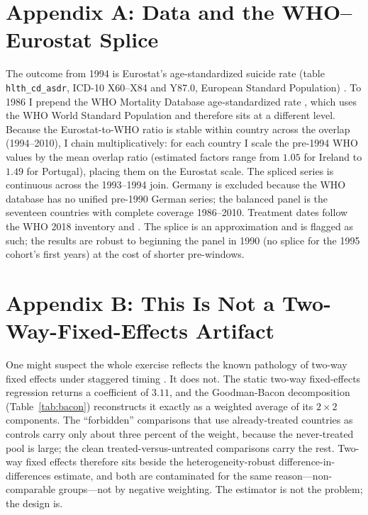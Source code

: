 \documentclass[12pt]{article}
\begin{document}
\clearpage
\appendix
\singlespacing

\section{Appendix A: Data and the WHO--Eurostat Splice}

The outcome from 1994 is Eurostat's age-standardized suicide rate (table \texttt{hlth\_cd\_asdr},
ICD-10 X60--X84 and Y87.0, European Standard Population) \citep{eurostat_cod}. To 1986 I prepend the
WHO Mortality Database age-standardized rate \citep{who_mdb}, which uses the WHO World Standard
Population and therefore sits at a different level. Because the Eurostat-to-WHO ratio is stable within
country across the overlap (1994--2010), I chain multiplicatively: for each country I scale the
pre-1994 WHO values by the mean overlap ratio (estimated factors range from $1.05$ for Ireland to
$1.49$ for Portugal), placing them on the Eurostat scale. The spliced series is continuous across the
1993--1994 join. Germany is excluded because the WHO database has no unified pre-1990 German series;
the balanced panel is the seventeen countries with complete coverage 1986--2010. Treatment dates
follow the WHO 2018 inventory and \citet{lewitzka2019national}. The splice is an approximation and is
flagged as such; the results are robust to beginning the panel in 1990 (no splice for the 1995
cohort's first years) at the cost of shorter pre-windows.

\section{Appendix B: This Is Not a Two-Way-Fixed-Effects Artifact}

One might suspect the whole exercise reflects the known pathology of two-way fixed effects under
staggered timing \citep{goodmanbacon2021did}. It does not. The static two-way fixed-effects
regression returns a coefficient of $3.11$, and the Goodman-Bacon decomposition
(Table~\ref{tab:bacon}) reconstructs it exactly as a weighted average of its $2\times2$ components.
The ``forbidden'' comparisons that use already-treated countries as controls carry only about three
percent of the weight, because the never-treated pool is large; the clean treated-versus-untreated
comparisons carry the rest. Two-way fixed effects therefore sits beside the heterogeneity-robust
difference-in-differences estimate, and both are contaminated for the same reason---non-comparable
groups---not by negative weighting. The estimator is not the problem; the design is.
\end{document}
